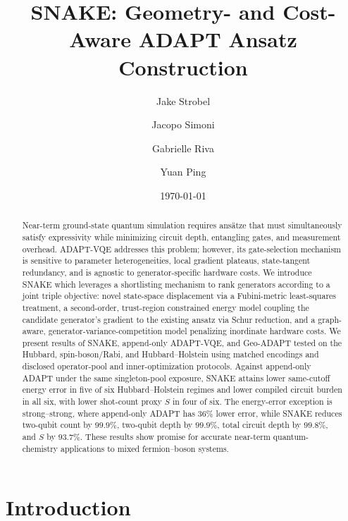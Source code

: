 \documentclass[
  reprint,
  amsmath,
  amssymb,
  aps,
  pra,
  nofootinbib,
  superscriptaddress,
  floatfix
]{revtex4-2}
\begin{document}
\title{SNAKE: Geometry- and Cost-Aware ADAPT Ansatz Construction}

\author{Jake Strobel}
\author{Jacopo Simoni}
\author{Gabrielle Riva}
\author{Yuan Ping}

\date{\today}



\begin{abstract}
Near-term ground-state quantum simulation requires ansätze that must simultaneously satisfy expressivity while minimizing circuit depth, entangling gates, and measurement overhead. ADAPT-VQE addresses this problem; however, its gate-selection mechanism is sensitive to parameter heterogeneities, local gradient plateaus, state-tangent redundancy, and is agnostic to generator-specific hardware costs. We introduce SNAKE which leverages a shortlisting mechanism to rank generators according to a joint triple objective: novel state-space displacement via a Fubini-metric least-squares treatment, a second-order, trust-region constrained energy model coupling the candidate generator's gradient to the existing ansatz via Schur reduction, and a graph-aware, generator-variance-competition model penalizing inordinate hardware costs. We present results of SNAKE, append-only ADAPT-VQE, and Geo-ADAPT tested on the Hubbard, spin-boson/Rabi, and Hubbard--Holstein using matched encodings and disclosed operator-pool and inner-optimization protocols. Against append-only ADAPT under the same singleton-pool exposure, SNAKE attains lower same-cutoff energy error in five of six Hubbard--Holstein regimes and lower compiled circuit burden in all six, with lower shot-count proxy \(S\) in four of six. The energy-error exception is strong--strong, where append-only ADAPT has \(36\%\) lower error, while SNAKE reduces two-qubit count by \(99.9\%\), two-qubit depth by \(99.9\%\), total circuit depth by \(99.8\%\), and \(S\) by \(93.7\%\). These results show promise for accurate near-term quantum-chemistry applications to mixed fermion--boson systems.


\end{abstract}

\maketitle







\section{Introduction}
\end{document}
